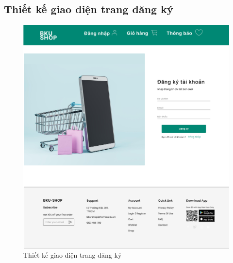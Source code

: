 \subsection {Thiết kế giao diện trang đăng ký}
\begin{figure}[H]
    \begin{center}
    \includegraphics[scale=0.2]{images/hieu/chap-4/signup.jpg}
    \vspace*{5mm}
    \caption{Thiết kế giao diện trang đăng ký}
    \end{center}
\end{figure}

